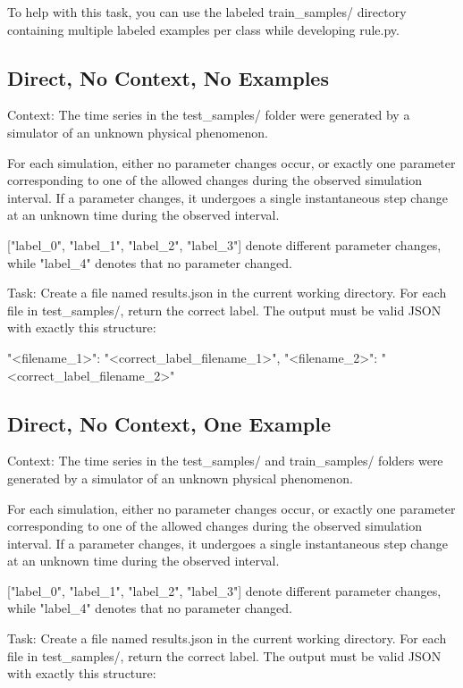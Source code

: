 \documentclass[11pt]{article}
\begin{document}
\begin{DocCode}
\begin{DocCode}
To help with this task, you can use the labeled train_samples/ directory containing multiple labeled examples per class while developing rule.py. 
\end{DocCode}

\subsection*{Direct, No Context, No Examples}
\begin{DocCode}
Context:
The time series in the test_samples/ folder were generated by a simulator of an unknown physical phenomenon.

For each simulation, either no parameter changes occur, or exactly one parameter corresponding to one of the allowed changes during the observed simulation interval.
If a parameter changes, it undergoes a single instantaneous step change at an unknown time during the observed interval.

["label_0", "label_1", "label_2", "label_3"] denote different parameter changes, while "label_4" denotes that no parameter changed.

Task:
Create a file named results.json in the current working directory.
For each file in test_samples/, return the correct label.
The output must be valid JSON with exactly this structure:
{

  "<filename_1>": "<correct_label_filename_1>",
  "<filename_2>": "<correct_label_filename_2>"

}
\end{DocCode}

\subsection*{Direct, No Context, One Example}
\begin{DocCode}
Context:
The time series in the test_samples/ and train_samples/ folders were generated by a simulator of an unknown physical phenomenon.

For each simulation, either no parameter changes occur, or exactly one parameter corresponding to one of the allowed changes during the observed simulation interval.
If a parameter changes, it undergoes a single instantaneous step change at an unknown time during the observed interval.

["label_0", "label_1", "label_2", "label_3"] denote different parameter changes, while "label_4" denotes that no parameter changed.

Task:
Create a file named results.json in the current working directory.
For each file in test_samples/, return the correct label.
The output must be valid JSON with exactly this structure:
{

}
\end{DocCode}
\end{DocCode}
\end{document}

